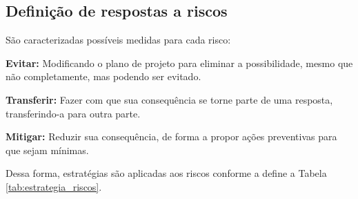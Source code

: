 \subsection{Definição de respostas a riscos}

São caracterizadas possíveis medidas para cada risco:

\textbf{Evitar:} 
Modificando o plano de projeto para eliminar a possibilidade, mesmo que não completamente, mas podendo ser evitado.

\textbf{Transferir:} 
Fazer com que sua consequência se torne parte de uma resposta, transferindo-a para outra parte.

\textbf{Mitigar:} 
Reduzir sua consequência, de forma a propor ações preventivas para que sejam mínimas.
 
\par Dessa forma, estratégias são aplicadas aos riscos conforme a define a Tabela \ref{tab:estrategia_riscos}.


